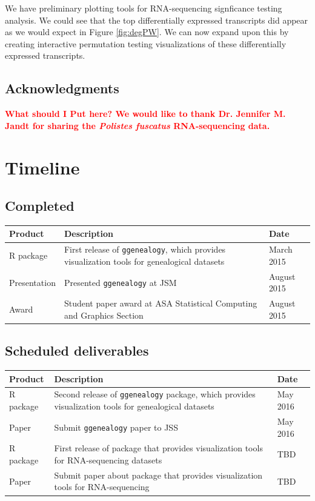 \documentclass[11pt,a4paper,oldfontcommands,openany]{memoir}
\numberwithin{equation}{section} %
\newcommand{\pkg}[1]{{\texttt{#1}}}
\begin{document}
We have preliminary plotting tools for RNA-sequencing signficance testing analysis. We could see that the top differentially expressed transcripts did appear as we would expect in Figure \ref{fig:degPW}. We can now expand upon this by creating interactive permutation testing visualizations of these differentially expressed transcripts.

\section{Acknowledgments}

\textbf{\textcolor{Red}{What should I Put here? We would like to thank Dr. Jennifer M. Jandt for sharing the \textit{Polistes fuscatus} RNA-sequencing data.}}

\chapter{Timeline}

\section{Completed}

\begin{tabular}{|p{3cm}|p{8cm}|p{3cm}|}
 \hline
 \textbf{Product} & \textbf{Description} & \textbf{Date} \\ 
 \hline
 R package & First release of \pkg{ggenealogy}, which provides visualization tools for genealogical datasets & March 2015 \\
 \hline
 Presentation & Presented \pkg{ggenealogy} at JSM & August 2015 \\
 \hline
 Award & Student paper award at ASA Statistical Computing and Graphics Section & August 2015 \\
 \hline
\end{tabular}

\section{Scheduled deliverables}

\begin{tabular}{|p{3cm}|p{8cm}|p{3cm}|}
 \hline
 \textbf{Product} & \textbf{Description} & \textbf{Date} \\ 
 \hline
 R package & Second release of \pkg{ggenealogy} package, which provides visualization tools for genealogical datasets & May 2016 \\
 \hline
 Paper & Submit \pkg{ggenealogy} paper to JSS & May 2016 \\
 \hline
 R package & First release of package that provides visualization tools for RNA-sequencing datasets & TBD \\
 \hline
 Paper & Submit paper about package that provides visualization tools for RNA-sequencing & TBD \\
 \hline
\end{tabular}
\end{document}
